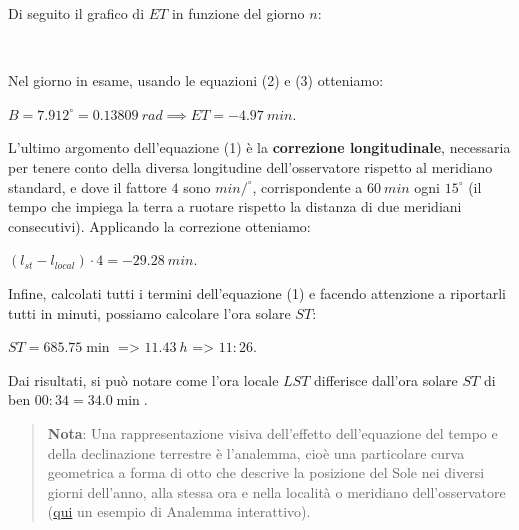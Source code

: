 \documentclass[11pt]{article}
\begin{document}
    Di seguito il grafico di \(ET\) in funzione del giorno \(n\):

    \begin{center}
    \end{center}
    { \hspace*{\fill} \\}
    
    Nel giorno in esame, usando le equazioni (2) e (3) otteniamo:
 
            
    
    \(B = 7.912^{\circ}=0.13809 \ rad \implies ET = -4.97 \ min\).

    

    L'ultimo argomento dell'equazione (1) è la \textbf{correzione
longitudinale}, necessaria per tenere conto della diversa longitudine
dell'osservatore rispetto al meridiano standard, e dove il fattore \(4\)
sono \(min/^{\circ}\), corrispondente a \(60 \ min\) ogni \(15^{\circ}\)
(il tempo che impiega la terra a ruotare rispetto la distanza di due
meridiani consecutivi). Applicando la correzione otteniamo:
 
            
    
    \((l_{st}-l_{local})\cdot4 = -29.28 \ min\).

    

    Infine, calcolati tutti i termini dell'equazione (1) e facendo
attenzione a riportarli tutti in minuti, possiamo calcolare l'ora solare
\(ST\):
 
            
    
    \(ST = 685.75 \min\) =\textgreater{} \(11.43 \ h\) =\textgreater{}
\(11{:}26\).

    
 
            
    
    Dai risultati, si può notare come l'ora locale \(LST\) differisce
dall'ora solare \(ST\) di ben \(00{:}34=34.0 \min\).

    

    \begin{quote}
\textbf{Nota}: Una rappresentazione visiva dell'effetto dell'equazione
del tempo e della declinazione terrestre è l'analemma, cioè una
particolare curva geometrica a forma di otto che descrive la posizione
del Sole nei diversi giorni dell'anno, alla stessa ora e nella località
o meridiano dell'osservatore
(\href{https://www.geogebra.org/m/vd3qpad8}{qui} un esempio di Analemma
interattivo).
\end{quote}
\end{document}

